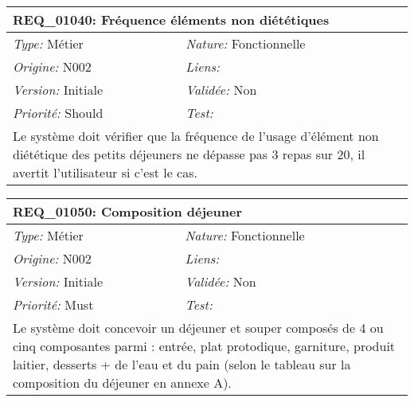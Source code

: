 \begin{table}[!ht]

\begin{tabular}{|p{60mm}p{100mm}|}

\hline

\multicolumn{2}{|l|}{\textbf{REQ\_01040:} Fréquence éléments non diététiques} \\ \hline

\emph{Type:} Métier & \emph{Nature:} Fonctionnelle \\

\emph{Origine:} N002 & \emph{Liens:}  \\

\emph{Version:} Initiale & \emph{Validée:} Non \\

\emph{Priorité:} Should & \emph{Test:} \\ \hline

\multicolumn{2}{|p{16cm}|}{Le système doit vérifier que la fréquence de l'usage d'élément non diététique des petits déjeuners ne dépasse pas 3 repas sur 20, il avertit l'utilisateur si c'est le cas.} \\ \hline

\end{tabular}

\end{table}



\begin{table}[!ht]

\begin{tabular}{|p{60mm}p{100mm}|}

\hline

\multicolumn{2}{|l|}{\textbf{REQ\_01050:} Composition déjeuner} \\ \hline

\emph{Type:} Métier & \emph{Nature:} Fonctionnelle \\

\emph{Origine:} N002 & \emph{Liens:}  \\

\emph{Version:} Initiale & \emph{Validée:} Non \\

\emph{Priorité:} Must & \emph{Test:} \\ \hline

\multicolumn{2}{|p{16cm}|}{Le système doit concevoir un déjeuner et souper composés de 4 ou cinq composantes parmi : entrée, plat protodique, garniture, produit laitier, desserts + de l'eau et du pain (selon le tableau sur la composition du déjeuner en annexe A).} \\ \hline

\end{tabular}

\end{table}



